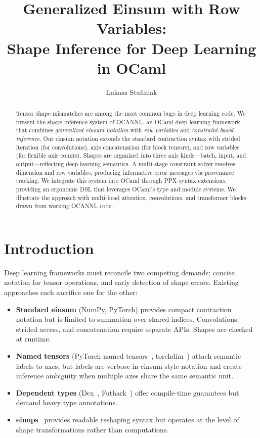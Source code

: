 \documentclass[acmsmall,nonacm,review]{acmart}
\begin{document}
\title{Generalized Einsum with Row Variables:\\Shape Inference for Deep Learning in OCaml}

\author{Lukasz Stafiniak}

\begin{abstract}
Tensor shape mismatches are among the most common bugs in deep learning code.
We present the shape inference system of OCANNL, an OCaml deep learning
framework that combines \emph{generalized einsum notation} with \emph{row
variables} and \emph{constraint-based inference}. Our einsum notation extends
the standard contraction syntax with strided iteration (for convolutions),
axis concatenation (for block tensors), and row variables (for flexible axis
counts). Shapes are organized into three axis kinds---batch, input, and
output---reflecting deep learning semantics. A multi-stage constraint solver
resolves dimension and row variables, producing informative error messages via
provenance tracking. We integrate this system into OCaml through PPX syntax
extensions, providing an ergonomic DSL that leverages OCaml's type and module
systems. We illustrate the approach with multi-head attention, convolutions,
and transformer blocks drawn from working OCANNL code.
\end{abstract}

\maketitle

\section{Introduction}
\label{sec:intro}

Deep learning frameworks must reconcile two competing demands: concise
notation for tensor operations, and early detection of shape errors.
Existing approaches each sacrifice one for the other:

\begin{itemize}
\item \textbf{Standard einsum} (NumPy, PyTorch) provides compact contraction
  notation but is limited to summation over shared indices. Convolutions,
  strided access, and concatenation require separate APIs. Shapes are checked
  at runtime.
\item \textbf{Named tensors} (PyTorch named tensors~\cite{chiang2021named},
  torchdim~\cite{ansel2024pytorch2}) attach semantic labels to axes, but
  labels are verbose in einsum-style notation and create inference ambiguity
  when multiple axes share the same semantic unit.
\item \textbf{Dependent types} (Dex~\cite{paszke2021getting},
  Futhark~\cite{henriksen2017futhark}) offer compile-time guarantees but
  demand heavy type annotations.
\item \textbf{einops}~\cite{rogozhnikov2022einops} provides readable
  reshaping syntax but operates at the level of shape transformations rather
  than computations.
\end{itemize}
\end{document}
